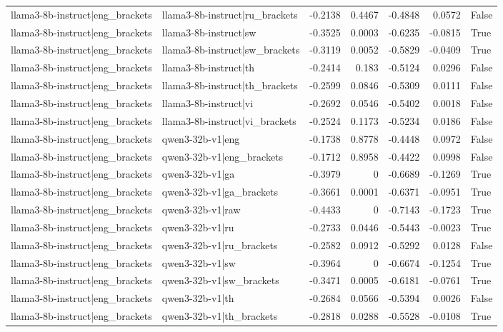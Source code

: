 \begin{table}
\begin{tabular}{l l r r r r l}
llama3-8b-instruct|eng_brackets & llama3-8b-instruct|ru_brackets & -0.2138 & 0.4467 & -0.4848 & 0.0572 & False \\
llama3-8b-instruct|eng_brackets & llama3-8b-instruct|sw & -0.3525 & 0.0003 & -0.6235 & -0.0815 & True \\
llama3-8b-instruct|eng_brackets & llama3-8b-instruct|sw_brackets & -0.3119 & 0.0052 & -0.5829 & -0.0409 & True \\
llama3-8b-instruct|eng_brackets & llama3-8b-instruct|th & -0.2414 & 0.183 & -0.5124 & 0.0296 & False \\
llama3-8b-instruct|eng_brackets & llama3-8b-instruct|th_brackets & -0.2599 & 0.0846 & -0.5309 & 0.0111 & False \\
llama3-8b-instruct|eng_brackets & llama3-8b-instruct|vi & -0.2692 & 0.0546 & -0.5402 & 0.0018 & False \\
llama3-8b-instruct|eng_brackets & llama3-8b-instruct|vi_brackets & -0.2524 & 0.1173 & -0.5234 & 0.0186 & False \\
llama3-8b-instruct|eng_brackets & qwen3-32b-v1|eng & -0.1738 & 0.8778 & -0.4448 & 0.0972 & False \\
llama3-8b-instruct|eng_brackets & qwen3-32b-v1|eng_brackets & -0.1712 & 0.8958 & -0.4422 & 0.0998 & False \\
llama3-8b-instruct|eng_brackets & qwen3-32b-v1|ga & -0.3979 & 0 & -0.6689 & -0.1269 & True \\
llama3-8b-instruct|eng_brackets & qwen3-32b-v1|ga_brackets & -0.3661 & 0.0001 & -0.6371 & -0.0951 & True \\
llama3-8b-instruct|eng_brackets & qwen3-32b-v1|raw & -0.4433 & 0 & -0.7143 & -0.1723 & True \\
llama3-8b-instruct|eng_brackets & qwen3-32b-v1|ru & -0.2733 & 0.0446 & -0.5443 & -0.0023 & True \\
llama3-8b-instruct|eng_brackets & qwen3-32b-v1|ru_brackets & -0.2582 & 0.0912 & -0.5292 & 0.0128 & False \\
llama3-8b-instruct|eng_brackets & qwen3-32b-v1|sw & -0.3964 & 0 & -0.6674 & -0.1254 & True \\
llama3-8b-instruct|eng_brackets & qwen3-32b-v1|sw_brackets & -0.3471 & 0.0005 & -0.6181 & -0.0761 & True \\
llama3-8b-instruct|eng_brackets & qwen3-32b-v1|th & -0.2684 & 0.0566 & -0.5394 & 0.0026 & False \\
llama3-8b-instruct|eng_brackets & qwen3-32b-v1|th_brackets & -0.2818 & 0.0288 & -0.5528 & -0.0108 & True \\

\end{tabular}
\end{table}
